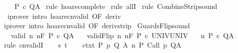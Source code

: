 \begin{isabellebody}
\ \ \ {\isachardoublequoteopen}{\isasymGamma}{\isacharcomma}{\isasymTheta}{\isasymturnstile}\isactrlbsub {\isacharslash}{\isacharbraceleft}{\isacharbraceright}\isactrlesub \ P\ c\ Q{\isacharcomma}A{\isachardoublequoteclose}\isanewline
%
\isadelimproof
%
\endisadelimproof
%
\isatagproof
{}\isamarkupfalse%
\ {\isacharparenleft}rule\ hoare{\isacharunderscore}complete{\isacharprime}{\isacharparenright}\isanewline
{}\isamarkupfalse%
\ {\isacharparenleft}rule\ allI{\isacharparenright}\isanewline
{}\isamarkupfalse%
\ {\isacharparenleft}rule\ CombineStrip{\isacharunderscore}sound{\isacharparenright}\isanewline
{}\isamarkupfalse%
\ \ {\isacharparenleft}iprover\ intro{\isacharcolon}\ hoare{\isacharunderscore}cnvalid\ {\isacharbrackleft}OF\ deriv{\isacharbrackright}{\isacharparenright}\isanewline
{}\isamarkupfalse%
\ {\isacharparenleft}iprover\ intro{\isacharcolon}\ hoare{\isacharunderscore}cnvalid\ {\isacharbrackleft}OF\ deriv{\isacharunderscore}strip{\isacharbrackright}{\isacharparenright}\isanewline
{}\isamarkupfalse%
%
\endisatagproof
{\isafoldproof}%
%
\isadelimproof
\isanewline
%
\endisadelimproof
\isanewline
{}\isamarkupfalse%
\ GuardsFlip{\isacharunderscore}sound{\isacharcolon}\ \isanewline
\ \ \ valid{\isacharcolon}\ {\isachardoublequoteopen}{\isasymforall}n{\isachardot}\ {\isasymGamma}{\isacharcomma}{\isasymTheta}{\isasymTurnstile}n{\isacharcolon}\isactrlbsub {\isacharslash}F\isactrlesub \ P\ c\ Q{\isacharcomma}A{\isachardoublequoteclose}\isanewline
\ \ \ validFlip{\isacharcolon}\ {\isachardoublequoteopen}{\isasymforall}n{\isachardot}\ {\isasymGamma}{\isacharcomma}{\isasymTheta}{\isasymTurnstile}n{\isacharcolon}\isactrlbsub {\isacharslash}{\isacharminus}F\isactrlesub \ P\ c\ UNIV{\isacharcomma}UNIV{\isachardoublequoteclose}\isanewline
\ \ \ {\isachardoublequoteopen}{\isasymGamma}{\isacharcomma}{\isasymTheta}{\isasymTurnstile}n{\isacharcolon}\isactrlbsub {\isacharslash}{\isacharbraceleft}{\isacharbraceright}\isactrlesub \ P\ c\ Q{\isacharcomma}A{\isachardoublequoteclose}\isanewline
%
\isadelimproof
%
\endisadelimproof
%
\isatagproof
{}\isamarkupfalse%
\ {\isacharparenleft}rule\ cnvalidI{\isacharparenright}\isanewline
\ \ \isamarkupfalse%
\ s\ t\isanewline
\ \ \isamarkupfalse%
\ ctxt{\isacharcolon}\ {\isachardoublequoteopen}{\isasymforall}{\isacharparenleft}P{\isacharcomma}\ p{\isacharcomma}\ Q{\isacharcomma}\ A{\isacharparenright}{\isasymin}{\isasymTheta}{\isachardot}\ {\isasymGamma}{\isasymTurnstile}n{\isacharcolon}\isactrlbsub {\isacharslash}{\isacharbraceleft}{\isacharbraceright}\isactrlesub \ P\ {\isacharparenleft}Call\ p{\isacharparenright}\ Q{\isacharcomma}A{\isachardoublequoteclose}\ \isanewline

\end{isabellebody}
